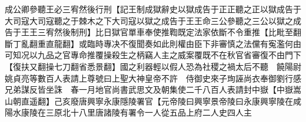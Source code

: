 成公卿參聽王必三宥然後行刑【記王制成獄辭史以獄成告于正正聽之正以獄成告于大司寇大司寇聽之于棘木之下大司寇以獄之成告于王王命三公參聽之三公以獄之成告于王王三宥然後制刑】比日獄官單車奉使推鞫既定法家依斷不令重推【比毗至翻斷丁亂翻重直龍翻】或臨時專决不復聞奏如此則權由臣下非審慎之法儻有寃濫何由可知况以九品之官專命推覆操殺生之柄竊人主之威案覆既不在秋官省審復不由門下【復扶又翻操七刀翻省悉景翻】國之利器輕以假人恐為社稷之禍太后不聽　饒陽尉姚貞亮等數百人表請上尊號曰上聖大神皇帝不許　侍御史來子珣誣尚衣奉御劉行感兄弟謀反皆坐誅　春一月地官尚書武思文及朝集使二千八百人表請封中嶽【中嶽嵩山朝直遥翻】己亥廢唐興寧永康隱陵署官【元帝陵曰興寧景帝陵曰永康興寧陵在咸陽水康陵在三原北十八里唐諸陵有署令一人從五品上府二人史四人主